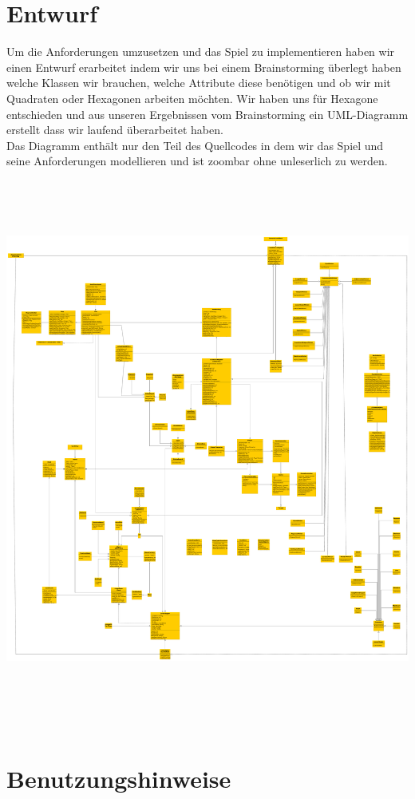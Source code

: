\documentclass[a4paper,12pt]{scrartcl}
\begin{document}
	\section{Entwurf}
	Um die Anforderungen umzusetzen und das Spiel zu implementieren haben wir einen Entwurf erarbeitet indem wir uns bei einem Brainstorming überlegt haben welche Klassen wir brauchen, welche Attribute diese benötigen und ob wir mit Quadraten oder Hexagonen arbeiten möchten. Wir haben uns für Hexagone entschieden und aus unseren Ergebnissen vom Brainstorming ein UML-Diagramm erstellt dass wir laufend überarbeitet haben.\\ Das Diagramm enthält nur den Teil des Quellcodes in dem wir das Spiel und seine Anforderungen modellieren und ist zoombar ohne unleserlich zu werden.\\
	\includegraphics[width=\textwidth, height=50em]{Entwurf}
	\section{Benutzungshinweise}
\end{document}
